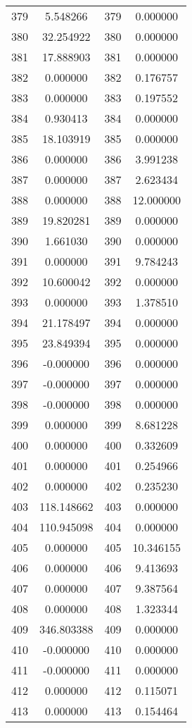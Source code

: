 \documentclass[12pt]{article}
\begin{document}
\begin{longtable}{@{}cccc@{}}
379 & 5.548266 & 379 & 0.000000 \\
380 & 32.254922 & 380 & 0.000000 \\
381 & 17.888903 & 381 & 0.000000 \\
382 & 0.000000 & 382 & 0.176757 \\
383 & 0.000000 & 383 & 0.197552 \\
384 & 0.930413 & 384 & 0.000000 \\
385 & 18.103919 & 385 & 0.000000 \\
386 & 0.000000 & 386 & 3.991238 \\
387 & 0.000000 & 387 & 2.623434 \\
388 & 0.000000 & 388 & 12.000000 \\
389 & 19.820281 & 389 & 0.000000 \\
390 & 1.661030 & 390 & 0.000000 \\
391 & 0.000000 & 391 & 9.784243 \\
392 & 10.600042 & 392 & 0.000000 \\
393 & 0.000000 & 393 & 1.378510 \\
394 & 21.178497 & 394 & 0.000000 \\
395 & 23.849394 & 395 & 0.000000 \\
396 & -0.000000 & 396 & 0.000000 \\
397 & -0.000000 & 397 & 0.000000 \\
398 & -0.000000 & 398 & 0.000000 \\
399 & 0.000000 & 399 & 8.681228 \\
400 & 0.000000 & 400 & 0.332609 \\
401 & 0.000000 & 401 & 0.254966 \\
402 & 0.000000 & 402 & 0.235230 \\
403 & 118.148662 & 403 & 0.000000 \\
404 & 110.945098 & 404 & 0.000000 \\
405 & 0.000000 & 405 & 10.346155 \\
406 & 0.000000 & 406 & 9.413693 \\
407 & 0.000000 & 407 & 9.387564 \\
408 & 0.000000 & 408 & 1.323344 \\
409 & 346.803388 & 409 & 0.000000 \\
410 & -0.000000 & 410 & 0.000000 \\
411 & -0.000000 & 411 & 0.000000 \\
412 & 0.000000 & 412 & 0.115071 \\
413 & 0.000000 & 413 & 0.154464 \\

\end{longtable}
\end{document}
